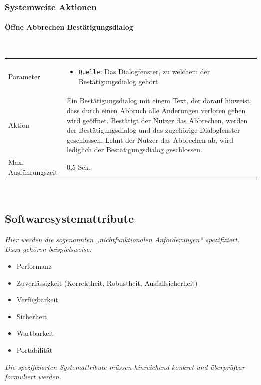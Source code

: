 \documentclass[fontsize=12pt,paper=a4,twoside]{scrartcl}
\begin{document}
\subsubsection{Systemweite Aktionen}

\paragraph{Öffne Abbrechen Bestätigungsdialog}\mbox{}\\

\begin{tabularx}{\textwidth}{p{4cm}X}
Parameter & \begin{itemize}[itemsep=0pt, leftmargin = 0.5cm]
			\item \texttt{Quelle}: Das Dialogfenster, zu welchem der Bestätigungsdialog gehört.
			\end{itemize}\\
Aktion & Ein Bestätigungsdialog mit einem Text, der darauf hinweist, dass durch einen Abbruch alle Änderungen verloren gehen wird geöffnet. Bestätigt der Nutzer das Abbrechen, werden der Bestätigungsdialog und das zugehörige Dialogfenster geschlossen. Lehnt der Nutzer das Abbrechen ab, wird lediglich der Bestätigungsdialog geschlossen.\\
Max. Ausführungszeit & 0,5 Sek. 
\end{tabularx}\\
  
\subsection{Softwaresystemattribute}
\label{sec:softwaresystemattribute}

  {\em Hier werden die sogenannten „nichtfunktionalen Anforderungen“
  spezifiziert. Dazu gehören beispielsweise:
  \begin{itemize}
    \item Performanz
    \item Zuverlässigkeit (Korrektheit, Robustheit, Ausfallsicherheit)
    \item Verfügbarkeit
    \item Sicherheit
    \item Wartbarkeit
    \item Portabilität
  \end{itemize}
}

{\em Die spezifizierten Systemattribute müssen hinreichend konkret und
  überprüfbar formuliert werden.}
\end{document}
